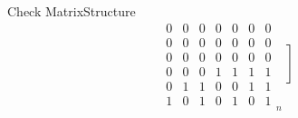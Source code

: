 \begin{frame}{Check Matrix}{Structure}
\[{\begin{matrix}
                0 & 0 & 0 & 0 & 0 & 0 & 0 \\
                0 & 0 & 0 & 0 & 0 & 0 & 0 \\
                0 & 0 & 0 & 0 & 0 & 0 & 0 \\
                0 & 0 & 0 & 1 & 1 & 1 & 1 \\
                0 & 1 & 1 & 0 & 0 & 1 & 1 \\
                1 & 0 & 1 & 0 & 1 & 0 & 1
            \end{matrix}
        }_{n}
        \left]\begin{matrix}
                  \, \\ \, \\ \, \\ \, \\ \, \\ \,
        \end{matrix}\right.
    \]

    \vspace*{2mm}

\end{frame}


